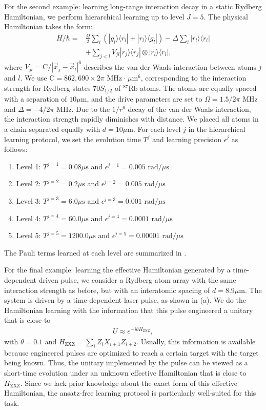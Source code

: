 \documentclass[twocolumn,superscriptaddress,aps,showpacs,amsmath,amstex,amssymb,citeautoscript,floatfix,pra,preprintnumbers]{revtex4-2}
\theoremstyle{plain}
\theoremstyle{plain}
\theoremstyle{plain}
\theoremstyle{plain}
\theoremstyle{plain}
\theoremstyle{plain}
\newcommand{\eqs}[1]{\begin{equation}\begin{split}#1\end{split}\end{equation}}
\begin{document}
\begin{appendix}
For the second example: learning long-range interaction decay in a static Rydberg Hamiltonian, we perform hierarchical learning up to level $J = 5$. The physical Hamiltonian takes the form:
\eqs{
H/\hbar = &\frac{\Omega}{2} \sum_{l} \left( |g_l\rangle \langle r_l| + |r_l\rangle \langle g_l| \right) - \Delta \sum_{l} |r_l\rangle \langle r_l| \\
&+ \sum_{j<l} V_{jl} |r_j\rangle \langle r_j| \otimes |r_l\rangle \langle r_l| ,
}
where $V_{jl} = \mathrm{C} / |\vec{x}_j - \vec{x}_l|^6$ describes the van der Waals interaction between atoms $j$ and $l$. We use $\mathrm{C} = 862{,}690 \times 2\pi$ MHz·$\mu$m$^6$, corresponding to the interaction strength for Rydberg states $70S_{1/2}$ of $^{87}\text{Rb}$ atoms. The atoms are equally spaced with a separation of $10\mu\text{m}$, and the drive parameters are set to $\Omega = 1.5/2\pi$ MHz and $\Delta = -4/2\pi$ MHz. Due to the $1/r^6$ decay of the van der Waals interaction, the interaction strength rapidly diminishes with distance. We placed all atoms in a chain separated equally with $d=10\mu\text{m}$. For each level $j$ in the hierarchical learning protocol, we set the evolution time $T^{j}$ and learning precision $\epsilon^{j}$ as follows:
\begin{enumerate}
    \item Level 1: $T^{j=1}=0.08\mu\text{s}$ and $\epsilon^{j=1}=0.005 \text{ rad}/\mu\text{s}$
    \item Level 2: $T^{j=2}=0.2\mu\text{s}$ and $\epsilon^{j=2}=0.005\text{ rad}/\mu\text{s}$
    \item Level 3: $T^{j=3}=6.0\mu\text{s}$ and $\epsilon^{j=3}=0.001\text{ rad}/\mu\text{s}$
    \item Level 4: $T^{j=4}=60.0\mu\text{s}$ and $\epsilon^{j=4}=0.0001\text{ rad}/\mu\text{s}$
    \item Level 5: $T^{j=5}=1200.0\mu\text{s}$ and $\epsilon^{j=5}=0.00001\text{ rad}/\mu\text{s}$
\end{enumerate}
The Pauli terms learned at each level are summarized in .

For the final example: learning the effective Hamiltonian generated by a time-dependent driven pulse, we consider a Rydberg atom array with the same interaction strength as before, but with an interatomic spacing of $d = 8.9\mu\text{m}$. The system is driven by a time-dependent laser pulse, as shown in (a). We do the Hamiltonian learning with the information that this pulse engineered a unitary that is close to 
\eqs{
U\approx e^{-i\theta H_{\text{ZXZ}}},
}
with $\theta=0.1$ and $H_{\text{ZXZ}}=\sum_{i}Z_{i}X_{i+1}Z_{i+2}$. Usually, this information is available because engineered pulses are optimized to reach a certain target with the target being known. Thus, the unitary implemented by the pulse can be viewed as a short-time evolution under an unknown effective Hamiltonian that is close to $H_{\text{ZXZ}}$. Since we lack prior knowledge about the exact form of this effective Hamiltonian, the ansatz-free learning protocol is particularly well-suited for this task.


\end{appendix}
\end{document}
